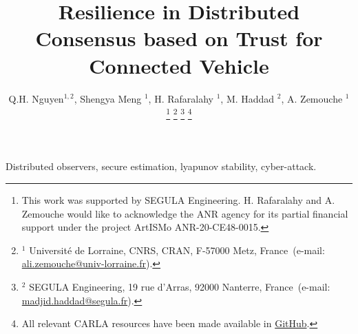 \documentclass[letterpaper, 10pt, conference]{ieeeconf}  %
\begin{document}
\title{\bf Resilience in Distributed
 Consensus based on Trust for Connected Vehicle }
\author{Q.H. Nguyen$^{1,2}$, Shengya Meng $^{1}$, H. Rafaralahy $^{1}$, M. Haddad $^{2}$, A. Zemouche $^{1}$
%
\thanks{This work was supported by SEGULA Engineering. H. Rafaralahy and A. Zemouche would like to acknowledge the ANR agency for its partial financial support under the project ArtISMo ANR-20-CE48-0015.
}
%
\thanks{$^{1}$ Universit\'e de Lorraine, CNRS, CRAN, F-57000 Metz, France~(e-mail: \protect\url{ali.zemouche@univ-lorraine.fr}).}
%
\thanks{$^{2}$ SEGULA Engineering, 19 rue d'Arras, 92000 Nanterre, France~(e-mail: \protect\url{madjid.haddad@segula.fr}).}
%
\thanks{All relevant CARLA resources have been made available in \protect\href{https://github.com/kslhuy/CACC_UIO_simulink}{GitHub}.}
}
\maketitle

\begin{abstract}

\end{abstract}

\begin{keywords}
Distributed observers, secure estimation, lyapunov stability, cyber-attack.
\end{keywords}
\end{document}
